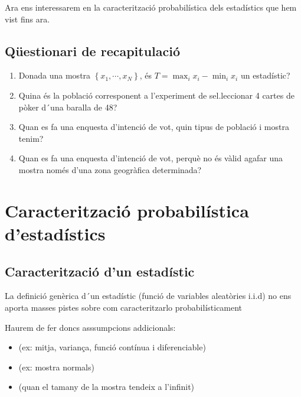 \documentclass[letterpaper,10pt,english]{sphinxmanual}
\begin{document}
Ara ens interessarem en la caracterització probabilística dels estadístics que hem vist fins ara.


\subsection{Qüestionari de recapitulació}
\label{\detokenize{0_Intro/0_2_Intro_stats:questionari-de-recapitulacio}}\begin{enumerate}
%
\item {} 
Donada una mostra \(\left\{x_1, \cdots, x_N\right\}\), és \(T = \max_i x_i - \min_i x_i\) un estadístic?

\item {} 
Quina és la població corresponent a l’experiment de sel.leccionar 4 cartes de pòker d´una baralla de 48?

\item {} 
Quan es fa una enquesta d’intenció de vot, quin tipus de població i mostra tenim?

\item {} 
Quan es fa una enquesta d’intenció de vot, perquè no és vàlid agafar una mostra només d’una zona geogràfica determinada?

\end{enumerate}


\section{Caracterització probabilística d’estadístics}
\label{\detokenize{0_Intro/0_2_Intro_stats:caracteritzacio-probabilistica-d-estadistics}}

\subsection{Caracterització d’un estadístic}
\label{\detokenize{0_Intro/0_2_Intro_stats:caracteritzacio-d-un-estadistic}}
La definició genèrica d´un estadístic (funció de variables aleatòries i.i.d)
no ens aporta masses pistes sobre com caracteritzar\sphinxhyphen{}lo probabilísticament

Haurem de fer doncs asssumpcions addicionals:
\begin{itemize}
\item {} 
 (ex: mitja, variança, funció contínua i diferenciable)

\item {} 
 (ex: mostra normals)

\item {} 
 (quan el tamany de la mostra tendeix a l’infinit)

\end{itemize}
\end{document}
